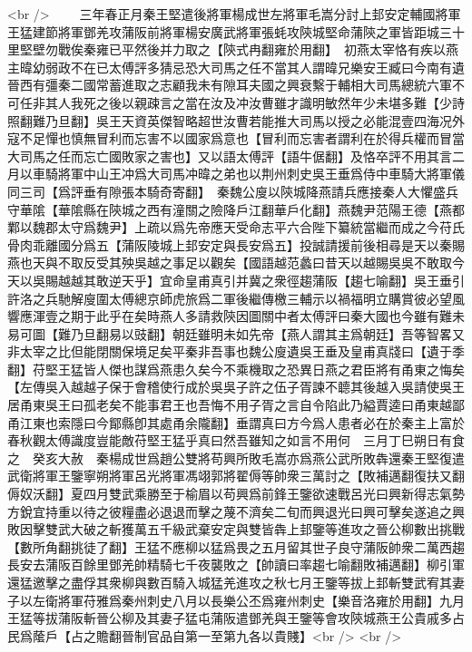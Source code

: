 <br />
　　三年春正月秦王堅遣後將軍楊成世左將軍毛嵩分討上邽安定輔國將軍王猛建節將軍鄧羌攻蒲阪前將軍楊安廣武將軍張蚝攻陝城堅命蒲陝之軍皆距城三十里堅壁勿戰俟秦雍已平然後并力取之【陝式冉翻雍於用翻】　初燕太宰恪有疾以燕主暐幼弱政不在已太傅評多猜忌恐大司馬之任不當其人謂暐兄樂安王臧曰今南有遺晉西有彊秦二國常蓄進取之志顧我未有隙耳夫國之興衰繫于輔相大司馬總統六軍不可任非其人我死之後以親疎言之當在汝及冲汝曹雖才識明敏然年少未堪多難【少詩照翻難乃旦翻】吳王天資英傑智略超世汝曹若能推大司馬以授之必能混壹四海况外寇不足憚也慎無冒利而忘害不以國家爲意也【冒利而忘害者謂利在於得兵權而冒當大司馬之任而忘亡國敗家之害也】又以語太傅評【語牛倨翻】及恪卒評不用其言二月以車騎將軍中山王冲爲大司馬冲暐之弟也以荆州刺史吳王垂爲侍中車騎大將軍儀同三司【爲評垂有隙張本騎奇寄翻】　秦魏公廋以陝城降燕請兵應接秦人大懼盛兵守華隂【華隂縣在陝城之西有潼關之險降戶江翻華戶化翻】燕魏尹范陽王德【燕都鄴以魏郡太守爲魏尹】上疏以爲先帝應天受命志平六合陛下纂統當繼而成之今苻氏骨肉乖離國分爲五【蒲阪陵城上邽安定與長安爲五】投誠請援前後相尋是天以秦賜燕也天與不取反受其殃吳越之事足以觀矣【國語越范蠡曰昔天以越賜吳吳不敢取今天以吳賜越越其敢逆天乎】宜命皇甫真引并冀之衆徑趨蒲阪【趨七喻翻】吳王垂引許洛之兵馳解廋圍太傅總京師虎旅爲二軍後繼傳檄三輔示以禍福明立購賞彼必望風響應渾壹之期于此乎在矣時燕人多請救陝因圖關中者太傅評曰秦大國也今雖有難未易可圖【難乃旦翻易以豉翻】朝廷雖明未如先帝【燕人謂其主爲朝廷】吾等智畧又非太宰之比但能閉關保境足矣平秦非吾事也魏公廋遺吳王垂及皇甫真牋曰【遺于季翻】苻堅王猛皆人傑也謀爲燕患久矣今不乘機取之恐異日燕之君臣將有甬東之悔矣【左傳吳入越越子保于會稽使行成於吳吳子許之伍子胥諫不聼其後越入吳請使吳王居甬東吳王曰孤老矣不能事君王也吾悔不用子胥之言自令陷此乃縊賈逵曰甬東越鄙甬江東也索隱曰今鄮縣卽其處甬余隴翻】垂謂真曰方今爲人患者必在於秦主上富於春秋觀太傅識度豈能敵苻堅王猛乎真曰然吾雖知之如言不用何　三月丁巳朔日有食之　癸亥大赦　秦楊成世爲趙公雙將苟興所敗毛嵩亦爲燕公武所敗犇還秦王堅復遣武衛將軍王鑒寧朔將軍呂光將軍馮翊郭將翟傉等帥衆三萬討之【敗補邁翻復扶又翻傉奴沃翻】夏四月雙武乘勝至于榆眉以苟興爲前鋒王鑒欲速戰呂光曰興新得志氣勢方銳宜持重以待之彼糧盡必退退而擊之蔑不濟矣二旬而興退光曰興可擊矣遂追之興敗因擊雙武大破之斬獲萬五千級武棄安定與雙皆犇上邽鑒等進攻之晉公柳數出挑戰【數所角翻挑徒了翻】王猛不應柳以猛爲畏之五月留其世子良守蒲阪帥衆二萬西趨長安去蒲阪百餘里鄧羌帥精騎七千夜襲敗之【帥讀曰率趨七喻翻敗補邁翻】柳引軍還猛邀擊之盡俘其衆柳與數百騎入城猛羌進攻之秋七月王鑒等拔上邽斬雙武宥其妻子以左衛將軍苻雅爲秦州刺史八月以長樂公丕爲雍州刺史【樂音洛雍於用翻】九月王猛等拔蒲阪斬晉公柳及其妻子猛屯蒲阪遣鄧羌與王鑒等會攻陝城燕王公貴戚多占民爲䕃戶【占之贍翻晉制官品自第一至第九各以貴賤】<br />
<br />
